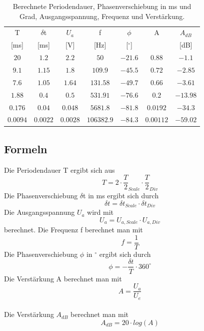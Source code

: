 \documentclass[12pt,a4paper,ngerman]{article}
\begin{document}
\begin{table}[H]
\begin{center}
\begin{tabular}{ |c|c|c|c|c|c|c| }
  \hline
    T & $\delta$t & $U_a$ & f & $\phi$ & A & $A_{dB}$\\

    [ms] & [ms] & [V] & [Hz] & [$^\circ$] & & [dB]\\
  \hline
$20$ & $1.2$ & $2.2$ & $50$ & $-21.6$ & $0.88$ & $-1.1$\\
  \hline
$9.1$ & $1.15$ & $1.8$ & $109.9$ & $-45.5$ & $0.72$ & $-2.85$\\
  \hline
$7.6$ & $1.05$ & $1.64$ & $131.58$ & $-49.7$ & $0.66$ & $-3.61$\\
  \hline
$1.88$ & $0.4$ & $0.5$ & $531.91$ & $-76.6$ & $0.2$ & $-13.98$\\
  \hline
$0.176$ & $0.04$ & $0.048$ & $5681.8$ & $-81.8$ & $0.0192$ & $-34.3$\\
  \hline
$0.0094$ & $0.0022$ & $0.0028$ & $106382.9$ & $-84.3$ & $0.00112$ & $-59.02$\\
  \hline
\end{tabular}
\caption{Berechnete Periodendauer, Phasenverschiebung in ms und Grad, Ausgangsspannung, Frequenz und Verstärkung.}
\end{center}
\label{tab:2_ber}
\end{table}

\subsection{Formeln}
Die Periodendauer T ergibt sich aus
\begin{equation}
T = 2 \cdot \frac{T}{2}_{Scale} \cdot \frac{T}{2}_{Div}
\end{equation}
Die Phasenverschiebung $\delta$t in ms ergibt sich durch
\begin{equation}
\delta t = \delta t_{Scale} \cdot \delta t_{Div}
\end{equation}
Die Ausgangsspannung $U_a$ wird mit
\begin{equation}
U_a = U_{a,Scale} \cdot U_{a,Div}
\end{equation}
berechnet.
Die Frequenz f berechnet man mit
\begin{equation}
f = \frac{1}{T}
\end{equation}
Die Phasenverschiebung $\phi$ in $^\circ$ ergibt sich durch
\begin{equation}
\phi = - \frac{\delta t}{T} \cdot 360^\circ
\end{equation}
Die Verstärkung A berechnet man mit
\begin{equation}
A = \frac{U_a}{U_e}
\end{equation}\\
Die Verstärkung $A_{dB}$ berechnet man mit
\begin{equation}
A_{dB} = 20 \cdot log(A)
\end{equation}
\end{document}
